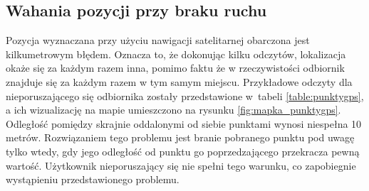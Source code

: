 \subsection{Wahania pozycji przy braku ruchu}\label{chap:wahania-pozycji}
Pozycja wyznaczana przy użyciu nawigacji satelitarnej obarczona jest kilkumetrowym błędem. Oznacza to, że dokonując kilku odczytów, lokalizacja okaże się za każdym razem inna, pomimo faktu że w rzeczywistości odbiornik znajduje się za każdym razem w tym samym miejscu. Przykładowe odczyty dla nieporuszającego się odbiornika zostały przedstawione w~tabeli \ref{table:punktygps}, a ich wizualizację na mapie umieszczono na rysunku \ref{fig:mapka_punktygps}. Odległość pomiędzy skrajnie oddalonymi od siebie punktami wynosi niespełna 10 metrów. Rozwiązaniem tego problemu jest branie pobranego punktu pod uwagę tylko wtedy, gdy jego odległość od punktu go poprzedzającego przekracza pewną wartość. Użytkownik nieporuszający się nie spełni tego warunku, co zapobiegnie wystąpieniu przedstawionego problemu.

